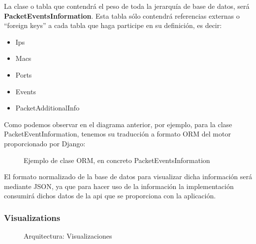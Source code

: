 La clase o tabla que contendrá el peso de toda la jerarquía de base de datos, será \textbf{PacketEventsInformation}. Esta tabla sólo contendrá referencias externas o ``foreign keys'' a cada tabla que haga participe en su definición, es decir:
\begin{itemize}
\item Ips
\item Macs
\item Ports
\item Events
\item PacketAdditionalInfo
\end{itemize}

Como podemos observar en el diagrama anterior, por ejemplo, para la clase PacketEventInformation, tenemos su traducción a formato ORM del motor proporcionado por Django:

\begin{figure}[H]

\caption{Ejemplo de clase ORM, en concreto PacketEventsInformation}
\end{figure}

El formato normalizado de la base de datos para visualizar dicha información será mediante JSON, ya que para hacer uso de la información la implementación consumirá dichos datos de la api que se proporciona con la aplicación.\\

\newpage
\subsubsection{Visualizations}

\begin{figure}[H]
  \caption{Arquitectura: Visualizaciones}
\end{figure}

